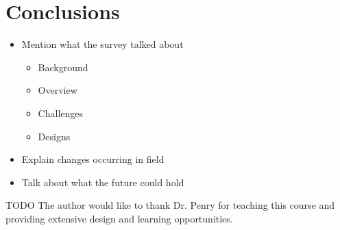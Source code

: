 \documentclass[prodmode,acmtecs]{acmsmall} %
\begin{document}
\section{Conclusions}
\begin{itemize}
\item Mention what the survey talked about
  \begin{itemize}
  \item Background
  \item Overview
  \item Challenges
  \item Designs
  \end{itemize}
\item Explain changes occurring in field
\item Talk about what the future could hold
\end{itemize}

\begin{acks}
TODO The author would like to thank Dr. Penry for teaching this course and providing extensive design and learning opportunities.
\end{acks}

% 
% 

\end{document}
